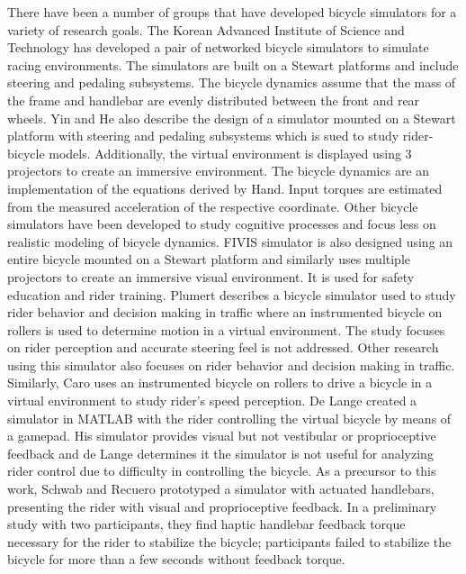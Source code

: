 \documentclass[11pt,a4paper,reqno]{amsart}
\begin{document}
There have been a number of groups that have developed bicycle simulators for a variety of research goals.
The Korean Advanced Institute of Science and Technology has developed a pair of networked bicycle simulators to simulate
racing environments\cite{kwon2002}.
The simulators are built on a Stewart platforms and include steering and pedaling subsystems.
The bicycle dynamics assume that the mass of the frame and handlebar are evenly distributed between the front and rear
wheels.
Yin and He also describe the design of a simulator mounted on a Stewart platform with steering and pedaling
subsystems\cite{he2005, yin2007implementation} which is sued to study rider-bicycle models\cite{yin2007study}.
Additionally, the virtual environment is displayed using 3 projectors to create an immersive environment.
The bicycle dynamics are an implementation of the equations derived by Hand\cite{hand1988}.
Input torques are estimated from the measured acceleration of the respective coordinate.
Other bicycle simulators have been developed to study cognitive processes and focus less on realistic modeling of
bicycle dynamics.
FIVIS simulator is also designed using an entire bicycle mounted on a Stewart platform and similarly uses multiple
projectors to create an immersive visual environment\cite{herpers2008}.
It is used for safety education and rider training.
Plumert describes a bicycle simulator used to study rider behavior and decision making in traffic\cite{plumert2004}
where an instrumented bicycle on rollers is used to determine motion in a virtual environment.
The study focuses on rider perception and accurate steering feel is not addressed.
Other research using this simulator also focuses on rider behavior and decision making in
traffic\cite{plumert2007,chihak2010,grechkin2013}.
Similarly, Caro uses an instrumented bicycle on rollers to drive a bicycle in a virtual environment to study rider's
speed perception\cite{caro2015}.
De Lange created a simulator in MATLAB with the rider controlling the virtual bicycle by means of a
gamepad\cite{delange2011}.
His simulator provides visual but not vestibular or proprioceptive feedback and de Lange determines it the
simulator is not useful for analyzing rider control due to difficulty in controlling the bicycle.
As a precursor to this work, Schwab and Recuero prototyped a simulator with actuated handlebars\cite{schwab2013},
presenting the rider with visual and proprioceptive feedback.
In a preliminary study with two participants, they find haptic handlebar feedback torque necessary for the rider to
stabilize the bicycle;
participants failed to stabilize the bicycle for more than a few seconds without feedback torque.
\end{document}
